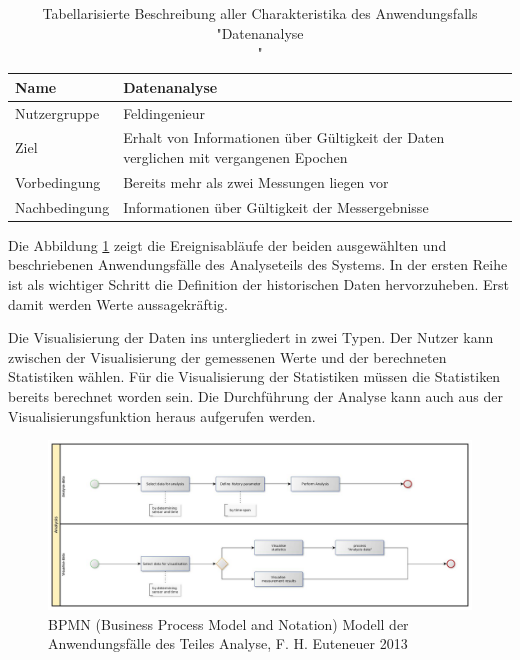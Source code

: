 \begin{table}[H]
\centering
\begin{tabular}{l | p{11cm}}
Name & Datenanalyse\\ \hline 
Nutzergruppe & Feldingenieur\\ \hline 
Ziel & Erhalt von Informationen über Gültigkeit der Daten verglichen mit vergangenen Epochen\\ \hline 
Vorbedingung & Bereits mehr als zwei Messungen liegen vor\\ \hline 
Nachbedingung & Informationen über Gültigkeit der Messergebnisse\\ 
\end{tabular}
\caption{Tabellarisierte Beschreibung aller Charakteristika des Anwendungsfalls "Datenanalyse\\"} 
\label{table:use case description of "Analyse data"}
\end{table}

Die Abbildung \ref{fig:bpmn_use-case_analysis} zeigt die Ereignisabläufe der beiden ausgewählten und beschriebenen Anwendungsfälle des Analyseteils des Systems. In der ersten Reihe ist als wichtiger Schritt die Definition der historischen Daten hervorzuheben. Erst damit werden Werte aussagekräftig.

Die Visualisierung der Daten ins untergliedert in zwei Typen. Der Nutzer kann zwischen der Visualisierung der gemessenen Werte und der berechneten Statistiken wählen. Für die Visualisierung der Statistiken müssen die Statistiken bereits berechnet worden sein. Die Durchführung der Analyse kann auch aus der Visualisierungsfunktion heraus aufgerufen werden.

\begin{figure}[H]
	\centering
 	 \includegraphics[scale=0.24]{graphics/bpmn_use-cases_analysis.jpg} 
	\caption{BPMN (Business Process Model and Notation) Modell der Anwendungsfälle des Teiles Analyse, F. H. Euteneuer 2013}
	 \label{fig:bpmn_use-case_analysis}
\end{figure}


